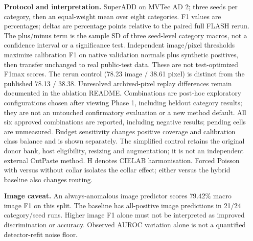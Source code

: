 \noindent\textbf{Protocol and interpretation.} SuperADD on MVTec AD 2; three seeds per category, then an equal-weight mean over eight categories. F1 values are percentages; deltas are percentage points relative to the paired full FLASH rerun. The plus/minus term is the sample SD of three seed-level category macros, not a confidence interval or a significance test. Independent image/pixel thresholds maximize calibration F1 on native validation normals plus synthetic positives, then transfer unchanged to real public-test data. These are not test-optimized F1max scores. The rerun control (78.23 image / 38.61 pixel) is distinct from the published 78.13 / 38.38. Unresolved archived-pixel replay differences remain documented in the ablation README. Combinations are post-hoc exploratory configurations chosen after viewing Phase 1, including heldout category results; they are not an untouched confirmatory evaluation or a new method default. All six approved combinations are reported, including negative results; pending cells are unmeasured. Budget sensitivity changes positive coverage and calibration class balance and is shown separately. The simplified control retains the original donor bank, host eligibility, resizing and augmentation; it is not an independent external CutPaste method. H denotes CIELAB harmonisation. Forced Poisson with versus without collar isolates the collar effect; either versus the hybrid baseline also changes routing.

\noindent\textbf{Image caveat.} An always-anomalous image predictor scores 79.42\% macro image F1 on this split. The baseline has all-positive image predictions in 21/24 category/seed runs. Higher image F1 alone must not be interpreted as improved discrimination or accuracy. Observed AUROC variation alone is not a quantified detector-refit noise floor.
